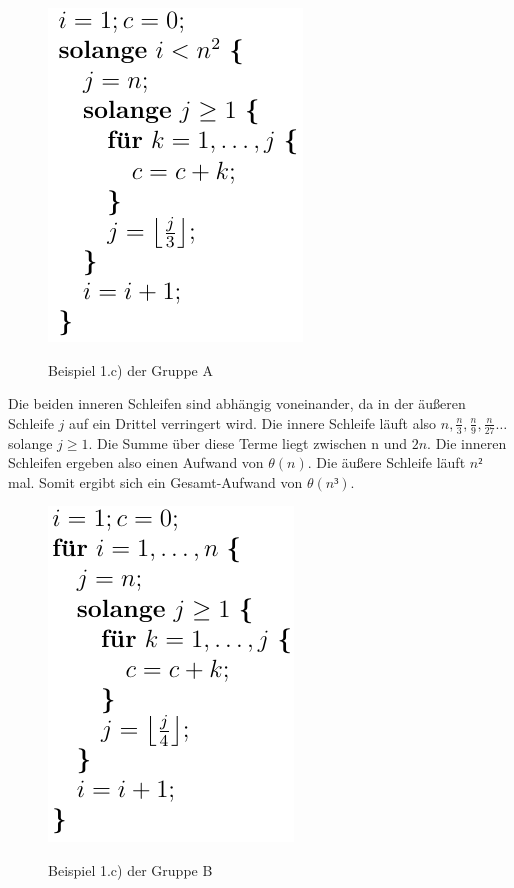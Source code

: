 \documentclass[a4paper, 12pt]{article}
\begin{document}
\begin{figure}[H]
	\caption{Beispiel 1.c) der Gruppe A}
	\vskip 0.2cm
	\centering
	\includegraphics{Figures/Test_2008-04-25_1Ac}
	\label{figure:Test_2008-04-25_1Ac}
\end{figure}

Die beiden inneren Schleifen sind abhängig voneinander, da in der äußeren Schleife $j$ auf ein Drittel verringert wird. Die innere Schleife läuft also $n,\frac{n}{3},\frac{n}{9},\frac{n}{27}\dots$ solange $j≥1$. Die Summe über diese Terme liegt zwischen n und $2n$. Die inneren Schleifen ergeben also einen Aufwand von $θ\left(n\right)$. Die äußere Schleife läuft $n²$ mal. Somit ergibt sich ein Gesamt-Aufwand von $θ\left(n³\right)$.

\begin{figure}[H]
	\caption{Beispiel 1.c) der Gruppe B}
	\vskip 0.2cm
	\centering
	\includegraphics{Figures/Test_2008-04-25_1Bc}
	\label{figure:Test_2008-04-25_1Bc}
\end{figure}
\end{document}
